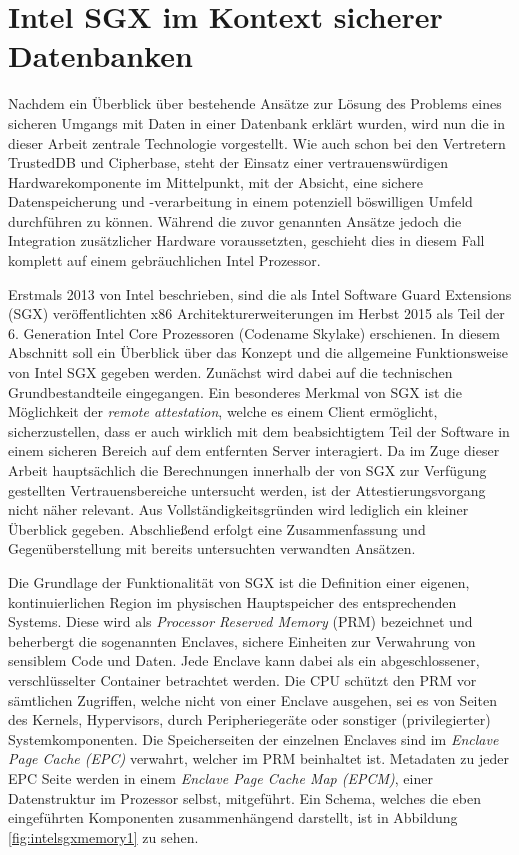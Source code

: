 \section{Intel SGX im Kontext sicherer Datenbanken}

Nachdem ein Überblick über bestehende Ansätze zur Lösung des Problems eines sicheren Umgangs mit Daten in einer Datenbank erklärt wurden, wird nun die in dieser Arbeit zentrale Technologie vorgestellt. Wie auch schon bei den Vertretern TrustedDB und Cipherbase, steht der Einsatz einer vertrauenswürdigen Hardwarekomponente im Mittelpunkt, mit der Absicht, eine sichere Datenspeicherung und -verarbeitung in einem potenziell böswilligen Umfeld durchführen zu können. Während die zuvor genannten Ansätze jedoch die Integration zusätzlicher Hardware voraussetzten, geschieht dies in diesem Fall komplett auf einem gebräuchlichen Intel Prozessor.

Erstmals 2013 von Intel beschrieben, sind die als Intel Software Guard Extensions (SGX) veröffentlichten x86 Architekturerweiterungen im Herbst 2015 als Teil der 6. Generation Intel Core Prozessoren (Codename Skylake) erschienen. In diesem Abschnitt soll ein Überblick über das Konzept und die allgemeine Funktionsweise von Intel SGX gegeben werden. Zunächst wird dabei auf die technischen Grundbestandteile eingegangen. Ein besonderes Merkmal von SGX ist die Möglichkeit der \textit{remote attestation}, welche es einem Client ermöglicht, sicherzustellen, dass er auch wirklich mit dem beabsichtigtem Teil der Software in einem sicheren Bereich auf dem entfernten Server interagiert. Da im Zuge dieser Arbeit hauptsächlich die Berechnungen innerhalb der von SGX zur Verfügung gestellten Vertrauensbereiche untersucht werden, ist der Attestierungsvorgang nicht näher relevant. Aus Vollständigkeitsgründen wird lediglich ein kleiner Überblick gegeben. Abschließend erfolgt eine Zusammenfassung und Gegenüberstellung mit bereits untersuchten verwandten Ansätzen.

Die Grundlage der Funktionalität von SGX ist die Definition einer eigenen, kontinuierlichen Region im physischen Hauptspeicher des entsprechenden Systems. Diese wird als \textit{Processor Reserved Memory} (PRM) bezeichnet und beherbergt die sogenannten Enclaves, sichere Einheiten zur Verwahrung von sensiblem Code und Daten. Jede Enclave kann dabei als ein abgeschlossener, verschlüsselter Container betrachtet werden. Die CPU schützt den PRM vor sämtlichen Zugriffen, welche nicht von einer Enclave ausgehen, sei es von Seiten des Kernels, Hypervisors, durch Peripheriegeräte oder sonstiger (privilegierter) Systemkomponenten. Die Speicherseiten der einzelnen Enclaves sind im \textit{Enclave Page Cache (EPC)} verwahrt, welcher im PRM beinhaltet ist. Metadaten zu jeder EPC Seite werden in einem \textit{Enclave Page Cache Map (EPCM)}, einer Datenstruktur im Prozessor selbst, mitgeführt. Ein Schema, welches die eben eingeführten Komponenten zusammenhängend darstellt, ist in Abbildung \ref{fig:intelsgxmemory1} zu sehen.

